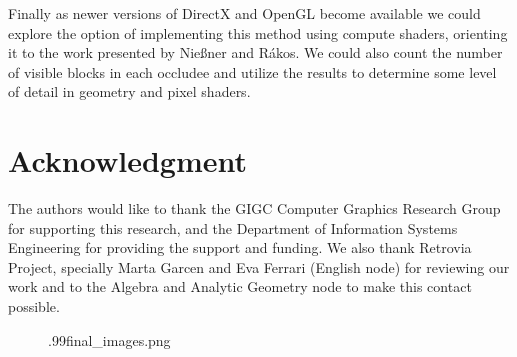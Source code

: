 \documentclass[10pt, conference]{IEEEtran}
\begin{document}
Finally as newer versions of DirectX and OpenGL become available we could explore the option of implementing this method using compute shaders, 
orienting it  to the work presented by Nie{\ss}ner\cite{occlusion_culling_tessellation} and R\'{a}kos\cite{rakos}. 
We could also count the number of visible blocks in each occludee and utilize the results to determine some level of detail in geometry and pixel shaders.



\iffinal
\section*{Acknowledgment}
%
The authors would like to thank the GIGC Computer Graphics Research Group for supporting this research, and the Department of Information Systems 
Engineering for providing the support and funding. We also thank Retrovia Project, specially Marta Garcen and Eva Ferrari (English node) for reviewing our work and to the Algebra and Analytic Geometry node to make this contact possible.
\fi














\begin{figure}[!hbp]
	{.99}{final_images.png}
\end{figure}
\end{document}
